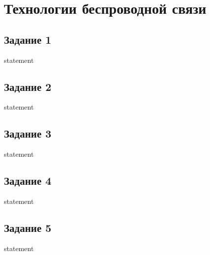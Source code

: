 \chapter{Технологии беспроводной связи}

\section{Задание 1}

{statement}

\section{Задание 2}

{statement}

\section{Задание 3}

{statement}

\section{Задание 4}

{statement}

\section{Задание 5}

{statement}